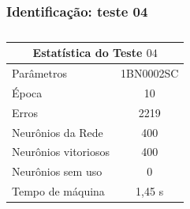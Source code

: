 \documentclass[aspectratio=10]{beamer} %
\begin{document}
\begin{frame}
	\frametitle{Identificação: teste 04}
\begin{table}[H]
	\centering
	\caption{}
	\label{Estatistica do teste $04$}
	\begin{tabular}{@{}lc@{}}
		\toprule
		\multicolumn{2}{c}{Estatística do Teste $04$}         \\ \midrule
		Parâmetros                  & 1BN0002SC \\
		Época                       & 10       \\
		Erros                       & 2219       \\
		Neurônios da Rede           & 400       \\
		Neurônios vitoriosos        & 400       \\
		Neurônios sem uso           & 0         \\
		Tempo de máquina            & 1,45 s   \\ \bottomrule
	\end{tabular}
\end{table} 
\end{frame}
\end{document}
